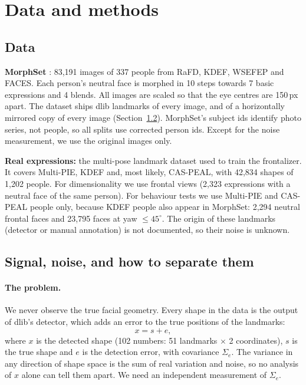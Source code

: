 \documentclass[11pt,a4paper]{article}
\begin{document}
\section{Data and methods}

\subsection{Data}

\textbf{MorphSet} \citep{vonikakis2021morphset}: 83,191 images of 337 people from RaFD, KDEF,
WSEFEP and FACES. Each person's neutral face is morphed in 10 steps towards 7 basic expressions
and 4 blends. All images are scaled so that the eye centres are 150\,px apart. The dataset ships
dlib landmarks of every image, and of a horizontally mirrored copy of every image
(Section~\ref{sec:signal-noise}). MorphSet's subject ids identify photo series, not people, so all
splits use corrected person ids. Except for the noise measurement, we use the original images
only.

\textbf{Real expressions:} the multi-pose landmark dataset used to train the frontalizer. It covers
Multi-PIE, KDEF and, most likely, CAS-PEAL, with 42,834 shapes of 1,202 people. For dimensionality
we use frontal views (2,323 expressions with a neutral face of the same person). For behaviour
tests we use Multi-PIE and CAS-PEAL people only, because KDEF people also appear in MorphSet:
2,294 neutral frontal faces and 23,795 faces at yaw $\le 45^\circ$. The origin of these landmarks
(detector or manual annotation) is not documented, so their noise is unknown.

\subsection{Signal, noise, and how to separate them}\label{sec:signal-noise}

\paragraph{The problem.} We never observe the true facial geometry. Every shape in the data is the
output of dlib's detector, which adds an error to the true positions of the landmarks:
\begin{equation}
  x = s + e,
\end{equation}
where $x$ is the detected shape (102 numbers: 51 landmarks $\times$ 2 coordinates), $s$ is the true
shape and $e$ is the detection error, with covariance $\Sigma_e$. The variance in any direction of
shape space is the sum of real variation and noise, so no analysis of $x$ alone can tell them
apart. We need an independent measurement of $\Sigma_e$.
\end{document}
